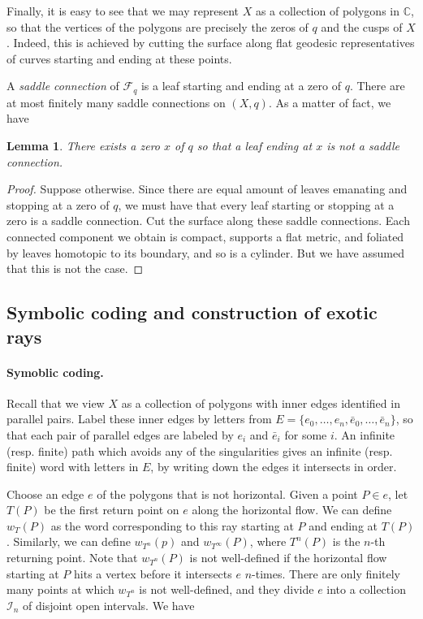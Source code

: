 \documentclass[11pt]{article} %
\theoremstyle{plain}
\newtheorem{lm}[thm]{Lemma}
\theoremstyle{definition}
\numberwithin{equation}{section}
\begin{document}
Finally, it is easy to see that we may represent $X$ as a collection of polygons in $\mathbb{C}$, so that the vertices of the polygons are precisely the zeros of $q$ and the cusps of $X$. Indeed, this is achieved by cutting the surface along flat geodesic representatives of curves starting and ending at these points.

A \emph{saddle connection} of $\mathcal{F}_q$ is a leaf starting and ending at a zero of $q$. There are at most finitely many saddle connections on $(X,q)$. As a matter of fact, we have
\begin{lm}\label{lm:saddle}
There exists a zero $x$ of $q$ so that a leaf ending at $x$ is not a saddle connection.
\end{lm}
\begin{proof}
Suppose otherwise. Since there are equal amount of leaves emanating and stopping at a zero of $q$, we must have that every leaf starting or stopping at a zero is a saddle connection. Cut the surface along these saddle connections. Each connected component we obtain is compact, supports a flat metric, and foliated by leaves homotopic to its boundary, and so is a cylinder. But we have assumed that this is not the case.
\end{proof}

\subsection{Symbolic coding and construction of exotic rays}
\paragraph{Symoblic coding.}
Recall that we view $X$ as a collection of polygons with inner edges identified in parallel pairs. Label these inner edges by letters from $E=\{e_0, \ldots, e_n, \bar{e}_0, \dots, \bar{e}_n\}$, so that each pair of parallel edges are labeled by $e_i$ and $\bar{e}_i$ for some $i$. An infinite (resp. finite) path which avoids any of the singularities gives an infinite (resp. finite) word with letters in $E$, by writing down the edges it intersects in order.

Choose an edge $e$ of the polygons that is not horizontal. Given a point $P\in e$, let $T(P)$ be the first return point on $e$ along the horizontal flow. We can define $w_T(P)$ as the word corresponding to this ray starting at $P$ and ending at $T(P)$. Similarly, we can define $w_{T^n}(p)$ and $w_{T^{\infty}}(P)$, where $T^n(P)$ is the $n$-th returning point. Note that $w_{T^n}(P)$ is not well-defined if the horizontal flow starting at $P$ hits a vertex before it intersects $e$ $n$-times. There are only finitely many points at which $w_{T^n}$ is not well-defined, and they divide $e$ into a collection $\mathcal{I}_n$ of disjoint open intervals. We have
\end{document}
